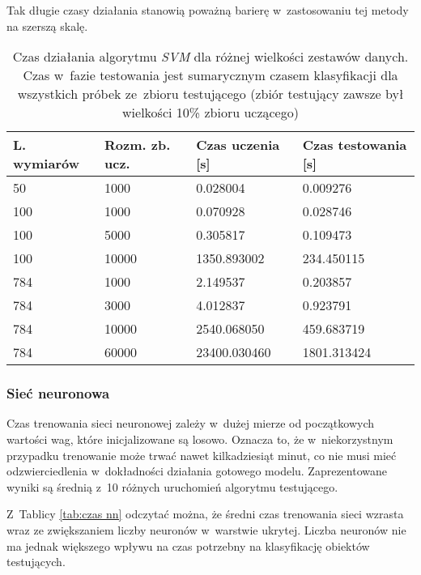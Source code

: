 \documentclass[12pt]{article}
\begin{document}
Tak długie czasy działania stanowią poważną barierę w~zastosowaniu tej metody na szerszą skalę.
\begin{table}[H]
\begin{center}
  \begin{tabular}[H]{|l|l|l|l|}
  \hline 
  \rowcolor[gray]{0.9}L. wymiarów & Rozm. zb. ucz.& Czas uczenia [s] & Czas testowania [s]  \\ \hline \hline
 50 & 1000  & 0.028004 & 0.009276 \\ \hline 
\hline
		        100 & 1000 & 0.070928 & 0.028746 \\ \hline 
		         100 & 5000 & 0.305817 & 0.109473 \\ \hline 
		        100 & 10000 & 1350.893002 & 234.450115\\ \hline 
\hline
		         784 & 1000 & 2.149537 & 0.203857 \\ \hline 
		         784 & 3000 & 4.012837 & 0.923791 \\ \hline 
		         784 & 10000 & 2540.068050 & 459.683719\\ \hline 
		         784 & 60000 & 23400.030460 & 1801.313424\\ \hline 

\end{tabular} 
\end{center}
 \caption{Czas działania algorytmu \emph{SVM} dla różnej wielkości zestawów danych. Czas w~fazie testowania jest sumarycznym czasem klasyfikacji dla wszystkich próbek ze~zbioru testującego (zbiór testujący zawsze był wielkości 10\% zbioru uczącego)} 
\label{tab: czas knn}
\end{table}



\subsubsection{Sieć neuronowa}\label{sec:czas nn}
Czas trenowania sieci neuronowej zależy w~dużej mierze od początkowych wartości wag, które inicjalizowane są losowo. Oznacza to, że w~niekorzystnym przypadku trenowanie może trwać nawet kilkadziesiąt minut, co nie musi mieć odzwierciedlenia
w~dokładności działania gotowego modelu. Zaprezentowane wyniki są średnią z~10 różnych uruchomień algorytmu testującego.

Z~Tablicy \ref{tab:czas nn} odczytać można, że średni czas trenowania sieci wzrasta wraz ze zwiększaniem liczby neuronów w~warstwie ukrytej. Liczba neuronów nie ma jednak większego wpływu na czas potrzebny na klasyfikację obiektów testujących.
\end{document}
